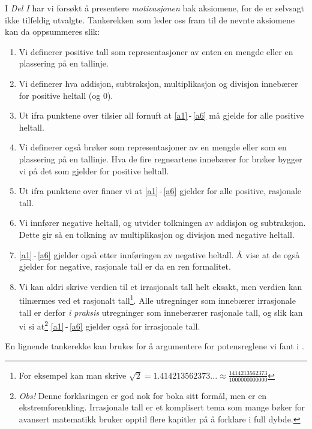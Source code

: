 \newpage
I \textsl{Del I} har vi forsøkt å presentere \textsl{motivasjonen} bak aksiomene, for de er selvsagt ikke tilfeldig utvalgte. Tankerekken som leder oss fram til de nevnte aksiomene kan da oppsummeres slik:
\begin{enumerate}
	\item Vi definerer positive tall som representasjoner av enten en mengde eller en plassering på en tallinje.
	\item Vi definerer hva addisjon, subtraksjon, multiplikasjon og divisjon innebærer for positive heltall (og 0).
	\item Ut ifra punktene over tilsier all fornuft at \eqref{a1}\,-\,\eqref{a6} må gjelde for alle positive heltall.
	\item Vi definerer også brøker som representasjoner av en mengde eller som en plassering på en tallinje. Hva de fire regneartene innebærer for brøker bygger vi på det som gjelder for positive heltall.
	\item Ut ifra punktene over finner vi at \eqref{a1}\,-\,\eqref{a6} gjelder for alle positive, rasjonale tall.
	\item Vi innfører negative heltall, og utvider tolkningen av addisjon og subtraksjon. Dette gir så en tolkning av multiplikasjon og divisjon med negative heltall.
	\item \eqref{a1}\,-\,\eqref{a6} gjelder også etter innføringen av negative heltall. Å vise at de også gjelder for negative, rasjonale tall er da en ren formalitet.
	\item Vi kan aldri skrive verdien til et irrasjonalt tall helt eksakt, men verdien kan tilnærmes ved et rasjonalt tall\footnote{For eksempel kan man skrive $ \sqrt{2}=1.414213562373...\approx\frac{1414213562373}{1000000000000} $}. Alle utregninger som innebærer irrasjonale tall er derfor \textsl{i praksis} utregninger som inneberærer rasjonale tall, og slik kan vi si at\footnote{\textit{Obs!} Denne forklaringen er god nok for boka sitt formål, men er en ekstrem\qquad forenkling. Irrasjonale tall er et komplisert tema som mange bøker for avansert matematikk bruker opptil flere kapitler på å forklare i full dybde.} \eqref{a1}\,-\,\eqref{a6} gjelder også for irrasjonale tall.
\end{enumerate}
En lignende tankerekke kan brukes for å argumentere for potensreglene vi fant i . 


